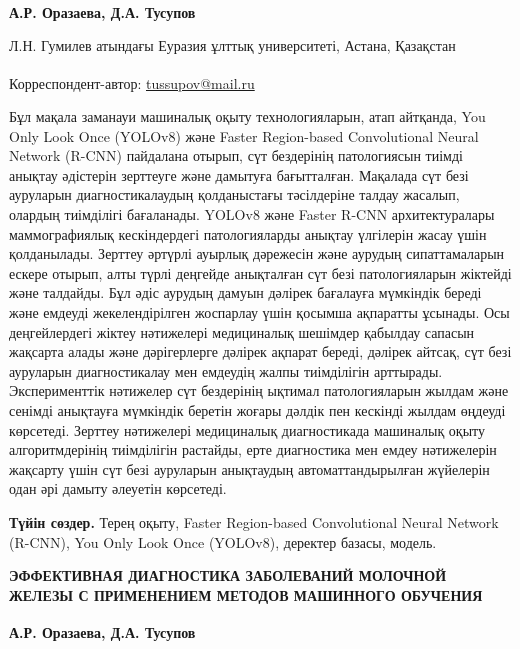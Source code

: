 
\begin{articleheader}

{\bfseries А.Р. Оразаева, Д.А. Тусупов\textsuperscript{\envelope }}
\end{articleheader}

\begin{affiliation}
Л.Н. Гумилев атындағы Еуразия ұлттық университеті, Астана, Қазақстан

\raggedright {\bfseries \textsuperscript{\envelope }}Корреспондент-автор: \href{mailto:oaris.83@gmail.com}{tussupov@mail.ru}
\end{affiliation}

Бұл мақала заманауи машиналық оқыту технологияларын, атап айтқанда, You
Only Look Once (YOLOv8) және Faster Region-based Convolutional Neural
Network (R-CNN) пайдалана отырып, сүт бездерінің патологиясын тиімді
анықтау әдістерін зерттеуге және дамытуға бағытталған. Мақалада сүт безі
ауруларын диагностикалаудың қолданыстағы тәсілдеріне талдау жасалып,
олардың тиімділігі бағаланады. YOLOv8 және Faster R-CNN архитектуралары
маммографиялық кескіндердегі патологияларды анықтау үлгілерін жасау үшін
қолданылады. Зерттеу әртүрлі ауырлық дәрежесін және аурудың
сипаттамаларын ескере отырып, алты түрлі деңгейде анықталған сүт безі
патологияларын жіктейді және талдайды. Бұл әдіс аурудың дамуын дәлірек
бағалауға мүмкіндік береді және емдеуді жекелендірілген жоспарлау үшін
қосымша ақпаратты ұсынады. Осы деңгейлердегі жіктеу нәтижелері
медициналық шешімдер қабылдау сапасын жақсарта алады және дәрігерлерге
дәлірек ақпарат береді, дәлірек айтсақ, сүт безі ауруларын
диагностикалау мен емдеудің жалпы тиімділігін арттырады. Эксперименттік
нәтижелер сүт бездерінің ықтимал патологияларын жылдам және сенімді
анықтауға мүмкіндік беретін жоғары дәлдік пен кескінді жылдам өңдеуді
көрсетеді. Зерттеу нәтижелері медициналық диагностикада машиналық оқыту
алгоритмдерінің тиімділігін растайды, ерте диагностика мен емдеу
нәтижелерін жақсарту үшін сүт безі ауруларын анықтаудың
автоматтандырылған жүйелерін одан әрі дамыту әлеуетін көрсетеді.

{\bfseries Түйін сөздер.} Терең оқыту, Faster Region-based Convolutional
Neural Network (R-CNN), You Only Look Once (YOLOv8), деректер базасы,
модель.

\begin{articleheader}
{\bfseries ЭФФЕКТИВНАЯ ДИАГНОСТИКА ЗАБОЛЕВАНИЙ МОЛОЧНОЙ ЖЕЛЕЗЫ С
ПРИМЕНЕНИЕМ МЕТОДОВ МАШИННОГО ОБУЧЕНИЯ}

{\bfseries А.Р. Оразаева, Д.А. Тусупов \textsuperscript{\envelope }}
\end{articleheader}

